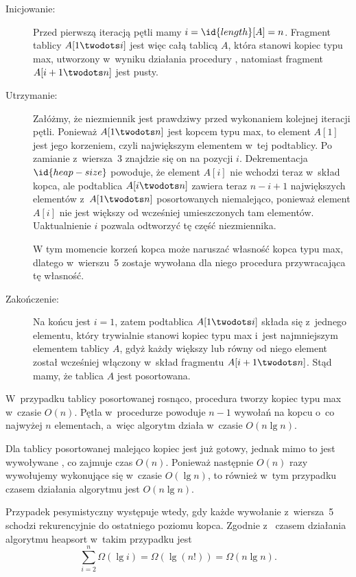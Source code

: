 \exercise %
\begin{description}
	\item[Inicjowanie:] Przed pierwszą iteracją pętli mamy $i=\id{length}[A]=n$. Fragment tablicy $A[1\twodots i]$ jest więc całą tablicą $A$, która stanowi kopiec typu max, utworzony w~wyniku działania procedury , natomiast fragment $A[i+1\twodots n]$ jest pusty.
	\item[Utrzymanie:] Załóżmy, że niezmiennik jest prawdziwy przed wykonaniem kolejnej iteracji pętli. Ponieważ $A[1\twodots n]$ jest kopcem typu max, to element $A[1]$ jest jego korzeniem, czyli największym elementem w~tej podtablicy. Po zamianie z~wiersza~3 znajdzie się on na pozycji $i$. Dekrementacja $\id{heap-size}$ powoduje, że element $A[i]$ nie wchodzi teraz w~skład kopca, ale podtablica $A[i\twodots n]$ zawiera teraz $n-i+1$ największych elementów z~$A[1\twodots n]$ posortowanych niemalejąco, ponieważ element $A[i]$ nie jest większy od wcześniej umieszczonych tam elementów. Uaktualnienie $i$ pozwala odtworzyć tę część niezmiennika.

	W tym momencie korzeń kopca może naruszać własność kopca typu max, dlatego w~wierszu~5 zostaje wywołana dla niego procedura  przywracająca tę własność.
	\item[Zakończenie:] Na końcu jest $i=1$, zatem podtablica $A[1\twodots i]$ składa się z~jednego elementu, który trywialnie stanowi kopiec typu max i~jest najmniejszym elementem tablicy $A$, gdyż każdy większy lub równy od niego element został wcześniej włączony w~skład fragmentu $A[i+1\twodots n]$. Stąd mamy, że tablica $A$ jest posortowana.
\end{description}

\exercise %
W~przypadku tablicy posortowanej rosnąco, procedura  tworzy kopiec typu max w~czasie $O(n)$. Pętla w~procedurze  powoduje $n-1$ wywołań  na kopcu o~co najwyżej $n$ elementach, a~więc algorytm działa w~czasie $O(n\lg n)$.

Dla tablicy posortowanej malejąco kopiec jest już gotowy, jednak mimo to jest wywoływane , co zajmuje czas $O(n)$. Ponieważ następnie $O(n)$ razy wywołujemy  wykonujące się w~czasie $O(\lg n)$, to również w~tym przypadku czasem działania algorytmu jest $O(n\lg n)$.

\exercise %
Przypadek pesymistyczny występuje wtedy, gdy każde wywołanie  z~wiersza~5 schodzi rekurencyjnie do ostatniego poziomu kopca. Zgodnie z~ czasem działania algorytmu heapsort w~takim przypadku jest
\[
	\sum_{i=2}^{n}\Omega(\lg i) = \Omega(\lg(n!)) = \Omega(n\lg n).
\]

